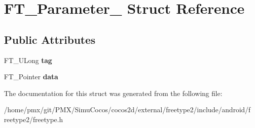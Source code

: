 \hypertarget{structFT__Parameter__}{}\section{F\+T\+\_\+\+Parameter\+\_\+ Struct Reference}
\label{structFT__Parameter__}
\subsection*{Public Attributes}
\begin{DoxyCompactItemize}
\item 
\mbox{\label{structFT__Parameter___a5a53ef2652683a2cd9ee6a0a694cb76b}} 
F\+T\+\_\+\+U\+Long {\bfseries tag}
\item 
\mbox{\label{structFT__Parameter___a930c8885bd25be8d054443153c817c13}} 
F\+T\+\_\+\+Pointer {\bfseries data}
\end{DoxyCompactItemize}


The documentation for this struct was generated from the following file\+:\begin{DoxyCompactItemize}
\item 
/home/pmx/git/\+P\+M\+X/\+Simu\+Cocos/cocos2d/external/freetype2/include/android/freetype2/freetype.\+h\end{DoxyCompactItemize}
